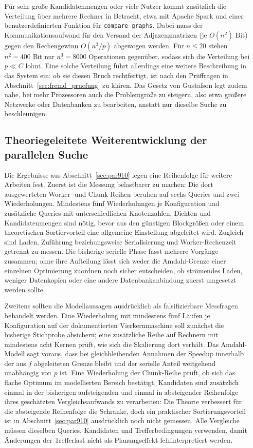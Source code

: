 \documentclass[a4paper,12pt, twoside]{report}
\theoremstyle{definition}
\begin{document}
Für sehr große Kandidatenmengen oder viele Nutzer kommt zusätzlich die Verteilung über mehrere Rechner in Betracht, etwa mit Apache Spark und einer benutzerdefinierten Funktion für \texttt{compare\_graphs}. Dabei muss der Kommunikationsaufwand für den Versand der Adjazenzmatrizen (je $O(n^2)$ Bit) gegen den Rechengewinn $O(n^3/p)$ abgewogen werden. Für $n\le 20$ stehen $n^2=400$ Bit nur $n^3=8000$ Operationen gegenüber, sodass sich die Verteilung bei $p\ll C$ lohnt. Eine solche Verteilung führt allerdings eine weitere Beschreibung in das System ein; ob sie diesen Bruch rechtfertigt, ist nach den Prüffragen in Abschnitt~\ref{sec:fremd_pruefung} zu klären. Das Gesetz von Gustafson \cite{gustafson1988} legt zudem nahe, bei mehr Prozessoren auch die Problemgröße zu steigern, also etwa größere Netzwerke oder Datenbanken zu bearbeiten, anstatt nur dieselbe Suche zu beschleunigen.

\subsection{Theoriegeleitete Weiterentwicklung der parallelen Suche}
\label{sec:parallel_theorie_ausblick}

Die Ergebnisse aus Abschnitt~\ref{sec:par910} legen eine Reihenfolge für weitere Arbeiten fest. Zuerst ist die Messung belastbarer zu machen: Die dort ausgewerteten Worker- und Chunk-Reihen beruhen auf sechs Queries und zwei Wiederholungen. Mindestens fünf Wiederholungen je Konfiguration und zusätzliche Queries mit unterschiedlichen Knotenzahlen, Dichten und Kandidatenmengen sind nötig, bevor aus den günstigen Blockgrößen oder einem theoretischen Sortiervorteil eine allgemeine Einstellung abgeleitet wird. Zugleich sind Laden, Zuführung beziehungsweise Serialisierung und Worker-Rechenzeit getrennt zu messen. Die bisherige serielle Phase fasst mehrere Vorgänge zusammen; ohne ihre Aufteilung lässt sich weder die Amdahl-Grenze einer einzelnen Optimierung zuordnen noch sicher entscheiden, ob strömendes Laden, weniger Datenkopien oder eine andere Datenbankanbindung zuerst umgesetzt werden sollte.

Zweitens sollten die Modellaussagen ausdrücklich als falsifizierbare Messfragen behandelt werden. Eine Wiederholung mit mindestens fünf Läufen je Konfiguration auf der dokumentierten Vierkernmaschine soll zunächst die bisherige Stichprobe absichern; eine zusätzliche Reihe auf Rechnern mit mindestens acht Kernen prüft, wie sich die Skalierung dort verhält. Das Amdahl-Modell sagt voraus, dass bei gleichbleibenden Annahmen der Speedup innerhalb der aus $f$ abgeleiteten Grenze bleibt und der serielle Anteil weitgehend unabhängig von $p$ ist. Eine Wiederholung der Chunk-Reihe prüft, ob sich das flache Optimum im modellierten Bereich bestätigt. Kandidaten sind zusätzlich einmal in der bisherigen aufsteigenden und einmal in absteigender Reihenfolge ihres geschätzten Vergleichsaufwands zu verarbeiten: Die Theorie verbessert für die absteigende Reihenfolge die Schranke, doch ein praktischer Sortierungsvorteil ist in Abschnitt~\ref{sec:par910} ausdrücklich noch nicht gemessen. Alle Vergleiche müssen dieselben Queries, Kandidaten und Trefferbedingungen verwenden, damit Änderungen der Trefferlast nicht als Planungseffekt fehlinterpretiert werden.
\end{document}
